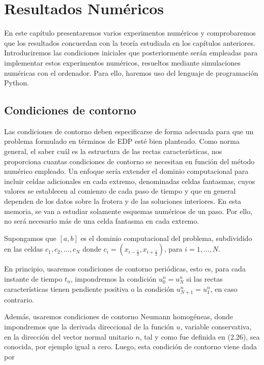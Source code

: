 \chapter{Resultados Numéricos}\label{ch:results}

En este capítulo presentaremos varios experimentos numéricos y
comprobaremos que los resultados concuerdan con la teoría estudiada
en los capítulos anteriores.
Introduciremos las condiciones iniciales que posteriormente serán
empleadas para implementar estos experimentos numéricos, resueltos
mediante simulaciones numéricas con el ordenador.
Para ello, haremos uso del lenguaje de programación Python.

\section{Condiciones de contorno}

Las condiciones de contorno deben especificarse de forma adecuada
para que un problema formulado en términos de EDP esté bien planteado.
Como norma general, el saber cuál es la estructura de las rectas
características, nos proporciona cuantas condiciones de contorno se
necesitan en función del método numérico empleado.
Un enfoque sería extender el dominio computacional para incluir
celdas adicionales en cada extremo, denominadas celdas fantasmas,
cuyos valores se establecen al comienzo de cada paso de tiempo y que
en general dependen de los datos sobre la frotera y de las soluciones
interiores.
En esta memoria, se van a estudiar solamente esquemas numéricos de un
paso.
Por ello, no será necesario más de una celda fantasma en cada extremo.

Supongamos que $\left[a,b\right]$ es el dominio computacional del
problema, subdividido en las celdas $c_{1},c_{2},\dotsc,c_{N}$ donde
$c_{i}=\left(x_{i-\frac{1}{2}},x_{i+\frac{1}{2}}\right)$, para
$i=1,\dotsc,N$.

En principio, usaremos condiciones de contorno periódicas, esto es,
para cada instante de tiempo $t_{n}$, impondremos la condición
$u^{n}_{0}=u^{n}_{N}$ si las rectas características tienen pendiente
positiva o la condición $u^{n}_{N+1}=u^{n}_{1}$, en caso contrario.

Además, usaremos condiciones de contorno Neumann homogéneas, donde
impondremos que la derivada direccional de la función $u$, variable
conservativa, en la dirección del vector normal unitario $n$, tal y
como fue definida en (2.26), sea conocida, por ejemplo igual a cero.
Luego, esta condición de contorno viene dada por

